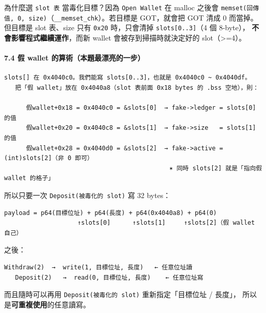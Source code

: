 \documentclass[10pt,a4paper]{article}
\begin{document}
為什麼選 \texttt{slot\ \allowbreak{}表} 當毒化目標？因為 \texttt{Open\ \allowbreak{}Wallet} 在
malloc 之後會
\texttt{memset(回傳值,\allowbreak{}\ \allowbreak{}0,\allowbreak{}\ \allowbreak{}size)}（\texttt{\_\allowbreak{}\_\allowbreak{}memset\_\allowbreak{}chk}）。若目標是
GOT，就會把 GOT 清成 0 而當掉。 但目標是 slot 表、size 只有
\texttt{0x20} 時，只會清掉 \texttt{slots{[}0..\allowbreak{}3{]}}（4 個 8-byte），
\textbf{不會影響程式繼續運作}，而新 wallet 會被存到掃描時就決定好的
slot（\textgreater=4）。

\paragraph{7.4 假 wallet
的算術（本題最漂亮的一步）}\label{ux5047-wallet-ux7684ux7b97ux8853ux672cux984cux6700ux6f02ux4eaeux7684ux4e00ux6b65}

\begin{Verbatim}[breaklines=true,breakanywhere=true,breakautoindent=false,fontsize=\fontsize{7.0}{9.5}\selectfont]
   slots[] 在 0x4040c0。我們能寫 slots[0..3]，也就是 0x4040c0 ~ 0x4040df。
   把「假 wallet」放在 0x4040a8（slot 表前面 0x18 bytes 的 .bss 空地），則：

      假wallet+0x18 = 0x4040c0 = &slots[0]  → fake->ledger = slots[0] 的值
      假wallet+0x20 = 0x4040c8 = &slots[1]  → fake->size   = slots[1] 的值
      假wallet+0x28 = 0x4040d0 = &slots[2]  → fake->active = (int)slots[2]（非 0 即可）
                                             ✶ 同時 slots[2] 就是「指向假 wallet 的格子」
\end{Verbatim}

所以只要一次 \texttt{Deposit(被毒化的\ \allowbreak{}slot)} 寫 32 bytes：

\begin{Verbatim}[breaklines=true,breakanywhere=true,breakautoindent=false,fontsize=\fontsize{7.0}{9.5}\selectfont]
   payload = p64(目標位址) + p64(長度) + p64(0x4040a8) + p64(0)
                    ↑slots[0]      ↑slots[1]     ↑slots[2]（假 wallet 自己）
\end{Verbatim}

之後：

\begin{Verbatim}[breaklines=true,breakanywhere=true,breakautoindent=false,fontsize=\fontsize{7.0}{9.5}\selectfont]
   Withdraw(2)  →  write(1, 目標位址, 長度)   ← 任意位址讀
   Deposit(2)   →  read(0, 目標位址, 長度)    ← 任意位址寫
\end{Verbatim}

而且隨時可以再用 \texttt{Deposit(被毒化的\ \allowbreak{}slot)} 重新指定「目標位址 /
長度」， 所以是\textbf{可重複使用}的任意讀寫。
\end{document}
